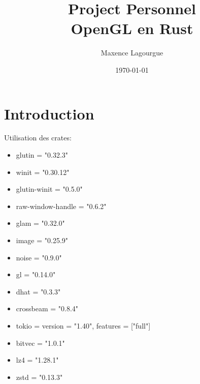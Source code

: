 \documentclass{report}
\title{\Huge{\bfseries Project Personnel\\OpenGL en Rust}}
\date{\today}
\author{Maxence Lagourgue}
\begin{document}
	
	\maketitle
	\tableofcontents
	
	\chapter{Introduction}
	Utilisation des crates:
	\begin{itemize}
	\item glutin = "0.32.3"
	\item winit = "0.30.12"
	\item glutin-winit = "0.5.0"
	\item raw-window-handle = "0.6.2"
	\item glam = "0.32.0"
	\item image = "0.25.9"
	\item noise = "0.9.0"
	\item gl = "0.14.0"
	\item dhat = "0.3.3"
	\item crossbeam = "0.8.4"
	\item tokio = { version = "1.40", features = ["full"] }
	\item bitvec = "1.0.1"
	\item lz4 = "1.28.1"
	\item zstd = "0.13.3"
	\end{itemize}
	
\end{document}
